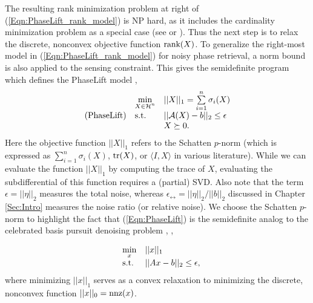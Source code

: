 The resulting rank minimization problem at right of (\ref{Eqn:PhaseLift_rank_model}) is NP hard, as it includes the cardinality minimization problem as a special case (see \cite{natarajan1995sparse} or  \cite{recht2010guaranteed}).  Thus the next step is to relax the discrete, nonconvex objective function $\textnormal{rank}(X)$.  To generalize the right-most model in (\ref{Eqn:PhaseLift_rank_model}) for noisy phase retrieval, a norm bound is also applied to the sensing constraint.  This gives the semidefinite program which defines the PhaseLift model \cite{DBLP:journals/siamis/CandesESV13}, \cite{candes2013phaselift}
\begin{equation} \label{Eqn:PhaseLift}
\begin{array}{lll}
	&	\min\limits_{\substack{X \in {\mathcal H}^n}}
		&	||X||_1 = \sum\limits_{\substack{i=1}}^{\substack{n}} \sigma_i(X)
			\\
\textnormal{(PhaseLift)}
	&	\textnormal{s.t.}
		& 	||{\mathcal A} (X) - b||_2 \leq \epsilon
			\\

	&
		&	X \succeq 0.

\end{array}
\end{equation}
Here the objective function $||X||_1$ refers to the Schatten $p$-norm (which is expressed as $\sum_{i=1}^n \sigma_i(X)$, $\mathrm{tr}(X)$, or $\langle I, X \rangle$ in various literature).
While we can evaluate the function $||X||_1$ by computing the trace of $X$, evaluating the subdifferential of this function requires a (partial) SVD.
Also note that the term $\epsilon = ||\eta||_2$ measures the total noise, whereas $\epsilon_\rel = ||\eta||_2 / ||b||_2$ discussed in Chapter \ref{Sec:Intro} measures the noise ratio (or relative noise).  We choose the Schatten $p$-norm to highlight the fact that (\ref{Eqn:PhaseLift}) is the semidefinite analog to the celebrated  basis pursuit denoising problem \cite{chen2001atomic}, \cite{candes2006stable},

\begin{equation}  			\label{Eqn:basis_pursuit}
\begin{array}{lll}
	&	\min\limits_{\substack{x}}
		&	||x||_1
			\\
	&	\textnormal{s.t.}
		&	||Ax-b||_2 \leq \epsilon,
\end{array}
\end{equation}
where minimizing $||x||_1$ serves as a convex relaxation to minimizing the discrete, nonconvex function $||x||_0 = \textnormal{nnz}(x)$.



